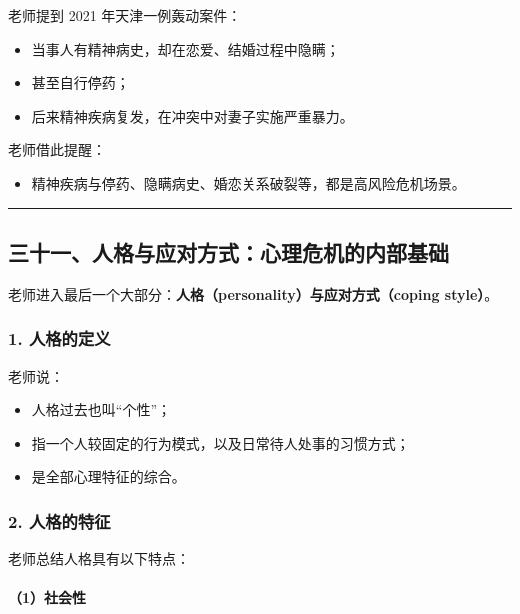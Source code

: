 \documentclass[
  chinese,
  9pt,
  a4paper,
]{ctexart}
\providecommand{\tightlist}{%
  \setlength{\itemsep}{0pt}\setlength{\parskip}{0pt}}
\begin{document}
老师提到 2021 年天津一例轰动案件：

\begin{itemize}
\tightlist
\item
  当事人有精神病史，却在恋爱、结婚过程中隐瞒；
\item
  甚至自行停药；
\item
  后来精神疾病复发，在冲突中对妻子实施严重暴力。
\end{itemize}

老师借此提醒：

\begin{itemize}
\tightlist
\item
  精神疾病与停药、隐瞒病史、婚恋关系破裂等，都是高风险危机场景。
\end{itemize}

\begin{center}\rule{0.5\linewidth}{0.5pt}\end{center}

\subsection{三十一、人格与应对方式：心理危机的内部基础}\label{ux4e09ux5341ux4e00ux4ebaux683cux4e0eux5e94ux5bf9ux65b9ux5f0fux5fc3ux7406ux5371ux673aux7684ux5185ux90e8ux57faux7840}

老师进入最后一个大部分：\textbf{人格（personality）与应对方式（coping
style）}。

\subsubsection{1. 人格的定义}\label{ux4ebaux683cux7684ux5b9aux4e49}

老师说：

\begin{itemize}
\tightlist
\item
  人格过去也叫``个性''；
\item
  指一个人较固定的行为模式，以及日常待人处事的习惯方式；
\item
  是全部心理特征的综合。
\end{itemize}

\subsubsection{2. 人格的特征}\label{ux4ebaux683cux7684ux7279ux5f81}

老师总结人格具有以下特点：

\paragraph{（1）社会性}\label{ux793eux4f1aux6027}
\end{document}
